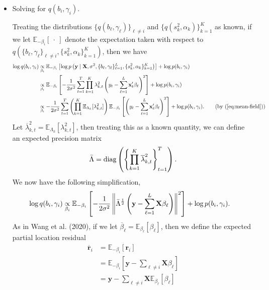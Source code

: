 \documentclass{article}
\newcommand{\E}{\mathbb{E}}
\begin{document}
\begin{itemize}

\item Solving for $q(b_i,\gamma_i)$.

Treating the distributions $\{q(b_\ell,\gamma_\ell)\}_{\ell \neq i}$ and $\{q(s^2_k,\alpha_k)\}_{k=1}^K$ as known, if we let $\E_{-\beta_i}[\:\cdot\:]$ denote the expectation taken with respect to $q(\{b_\ell,\gamma_\ell\}_{\ell \neq i}, \{s^2_k,\alpha_k\}_{k=1}^K)$, then we have 
\begin{align*}
    \log q(b_i,\gamma_i) &\underset{\beta_i}{\propto} \E_{-\beta_i} \left[\log p\left(\mathbf{y} \;|\; \mathbf{X}, \sigma^2, \{b_\ell,\gamma_\ell\}_{\ell=1}^L, \{s^2_k,\alpha_k\}_{k=1}^K\right)\right] + \log p(b_i,\gamma_i) \\
    &\underset{\beta_i}{\propto} \E_{-\beta_i} \left[-\frac{1}{2\sigma^2}\sum_{t=1}^T\prod_{k=1}^K\lambda_{k,t}^2\left(y_t - \sum_{\ell=1}^L \mathbf{x}'_t\beta_\ell\right)^2\right] + \log p(b_i,\gamma_i) \\ 
    &\underset{\beta_i}{\propto} -\frac{1}{2\sigma^2}\sum_{t=1}^T \left(\prod_{k=1}^K\E_{\Lambda_k}[\lambda_{k,t}^2]\right)\E_{-\beta_i} \left[\left(y_t - \sum_{\ell=1}^L \mathbf{x}'_t\beta_\ell\right)^2\right] + \log p(b_i,\gamma_i). \tag{by (\ref{eq:mean-field})}
\end{align*}
Let $\overline{\lambda}^2_{k,t} = \E_{\Lambda_k}[\lambda_{k,t}^{2}]$, then treating this as a known quantity, we can define an expected precision matrix
\begin{align*}
    \Bar{\Lambda} = \text{diag}\left(\left\{\prod_{k=1}^K\overline{\lambda}^2_{k,t}\right\}_{t=1}^T\right).
\end{align*}
We now have the following simplification,
\begin{align*}
     \log q(b_i,\gamma_i) &\underset{\beta_i}{\propto} \E_{-\beta_i} \left[-\frac{1}{2\sigma^2}\left\lVert  \Bar{\Lambda}^{\frac{1}{2}} \left(\mathbf{y} - \sum_{\ell=1}^L \mathbf{X} \beta_\ell\right) \right\rVert^2\right] + \log p(b_i,\gamma_i).
\end{align*}
As in Wang et al. (2020), if we let $ \overline{\beta}_\ell = \E_{\beta_\ell}\left[\beta_\ell\right]$, then we define the expected partial location residual
\begin{align*}
    \overline{\mathbf{r}}_i &= \E_{-\beta_i}[\mathbf{r}_i] \\
    &= \E_{-\beta_i}\left[\mathbf{y} - \sum_{\ell \neq i} \mathbf{X} \beta_\ell\right] \\
    &= \mathbf{y} - \sum_{\ell \neq i} \mathbf{X} \E_{\beta_\ell}\left[\beta_\ell\right] \\

\end{align*}
\end{itemize}
\end{document}
